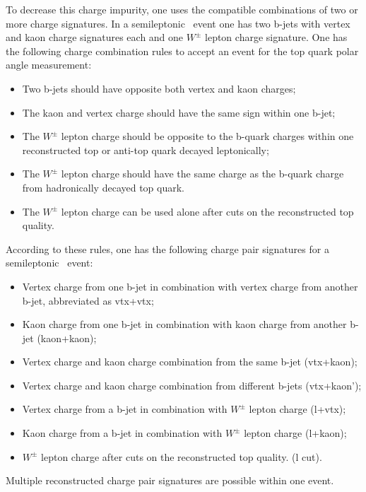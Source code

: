 To decrease this charge impurity, one uses the compatible combinations of two or more charge signatures.
In a semileptonic \ttbar\ event one has two b-jets with vertex and kaon charge signatures each and one $W^\pm$ lepton charge signature. 
One has the following charge combination rules to accept an event for the top quark polar angle measurement:
\begin{itemize}
	\item Two b-jets should have opposite both vertex and kaon charges;
	\item The kaon and vertex charge should have the same sign within one b-jet;
	\item The $W^\pm$ lepton charge should be opposite to the b-quark charges within one reconstructed top or anti-top quark decayed leptonically; 
	\item The  $W^\pm$ lepton charge should have the same charge as the b-quark charge from hadronically decayed top quark.
	\item The $W^\pm$ lepton charge can be used alone after cuts on the reconstructed top quality.
\end{itemize}

According to these rules, one has the following charge pair signatures for a semileptonic \ttbar\ event:
\begin{itemize}
	\item Vertex charge from one b-jet in combination with vertex charge from another b-jet, abbreviated as {\sc vtx+vtx};
	\item Kaon charge from one b-jet in combination with kaon charge from another b-jet ({\sc kaon+kaon});
	\item Vertex charge and kaon charge combination from the same b-jet ({\sc vtx+kaon});
	\item Vertex charge and kaon charge combination from different b-jets ({\sc vtx+kaon'});
	\item  Vertex charge from a b-jet  in combination with $W^\pm$ lepton charge ({\sc l+vtx});
	\item  Kaon charge from a b-jet in combination with $W^\pm$ lepton charge ({\sc l+kaon});
	\item $W^\pm$ lepton charge after cuts on the reconstructed top quality. ({\sc l }cut).
\end{itemize}
Multiple reconstructed charge pair signatures are possible within one event.

